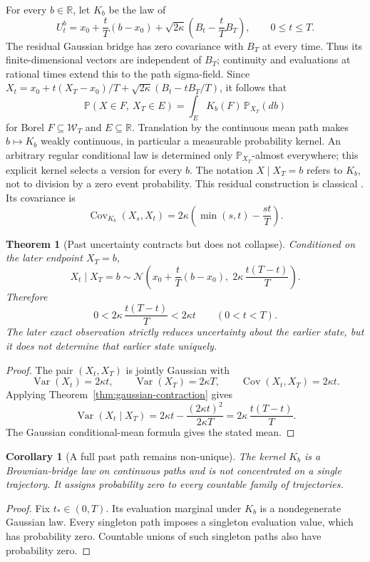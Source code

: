 \documentclass[11pt]{article}
\newtheorem{theorem}[definition]{Theorem}
\newtheorem{corollary}[definition]{Corollary}
\newcommand{\Wcal}{\mathcal W}
\begin{document}
For every $b\in\mathbb R$, let $K_b$ be the law of
\[
U_t^b=x_0+\frac tT(b-x_0)
+\sqrt{2\kappa}\left(B_t-\frac tT B_T\right),
\qquad 0\le t\le T.
\]
The residual Gaussian bridge has zero covariance with $B_T$ at every
time. Thus its finite-dimensional vectors are independent of $B_T$;
continuity and evaluations at rational times extend this to the path
sigma-field. Since $X_t= x_0+t(X_T-x_0)/T+
\sqrt{2\kappa}(B_t-tB_T/T)$, it follows that
\[
\mathbb P(X\in F,\ X_T\in E)
=\int_E K_b(F)\,\mathbb P_{X_T}(db)
\]
for Borel $F\subseteq\Wcal_T$ and $E\subseteq\mathbb R$.
Translation by the continuous mean path makes $b\mapsto K_b$ weakly
continuous, in particular a measurable probability kernel.
An arbitrary regular conditional law is determined only
$\mathbb P_{X_T}$-almost everywhere; this explicit kernel selects a
version for every $b$. The notation $X\mid X_T=b$ refers to $K_b$,
not to division by a zero event probability. This residual construction
is classical \cite[Theorem 22.1 and the following remark]{Pitman2003}.
Its covariance is
\[
\operatorname{Cov}_{K_b}(X_s,X_t)
=2\kappa\left(\min(s,t)-\frac{st}{T}\right).
\]

\begin{theorem}[Past uncertainty contracts but does not collapse]
\label{thm:brownian-bridge}
Conditioned on the later endpoint \(X_T=b\),
\[
X_t\mid X_T=b
\sim
\mathcal N\!\left(
x_0+\frac{t}{T}(b-x_0),
\;
2\kappa\,\frac{t(T-t)}{T}
\right).
\]
Therefore
\[
0<
2\kappa\,\frac{t(T-t)}{T}
<
2\kappa t
\qquad
(0<t<T).
\]
The later exact observation strictly reduces uncertainty about the earlier state, but it does
not determine that earlier state uniquely.
\end{theorem}

\begin{proof}
The pair \((X_t,X_T)\) is jointly Gaussian with
\[
\operatorname{Var}(X_t)=2\kappa t,
\qquad
\operatorname{Var}(X_T)=2\kappa T,
\qquad
\operatorname{Cov}(X_t,X_T)=2\kappa t.
\]
Applying Theorem~\ref{thm:gaussian-contraction} gives
\[
\operatorname{Var}(X_t\mid X_T)
=
2\kappa t-\frac{(2\kappa t)^2}{2\kappa T}
=
2\kappa\,\frac{t(T-t)}{T}.
\]
The Gaussian conditional-mean formula gives the stated mean.
\end{proof}

\begin{corollary}[A full past path remains non-unique]
\label{cor:path-nonuniqueness}
The kernel $K_b$ is a Brownian-bridge law on continuous paths
and is not concentrated on a single trajectory. It assigns probability
zero to every countable family of trajectories.
\end{corollary}
\begin{proof}
Fix $t_*\in(0,T)$. Its evaluation marginal under $K_b$ is a
nondegenerate Gaussian law. Every singleton path imposes a singleton
evaluation value, which has probability zero. Countable unions of such
singleton paths also have probability zero.
\end{proof}
\end{document}
